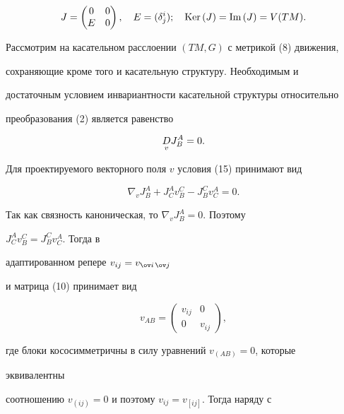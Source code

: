 $$


J=


\begin{pmatrix}


0 & 0 \\ E & 0


\end{pmatrix}


,\quad E=(\delta^i_j);\quad


\text{Ker\,}(J)=\text{Im\,}(J)=V(TM).


$$





Рассмотрим на касательном расслоении $(TM,G)$ с метрикой (8) движения,


сохраняющие кроме того и касательную структуру. Необходимым и


достаточным условием инвариантности касательной структуры относительно


преобразования (2) является равенство


\begin{equation}


\down{v}{D}J^A_B=0.


\end{equation}


Для проектируемого векторного поля $v$ условия (15) принимают вид


$$


\nabla_v J^A_B+J^A_C v^C_B-J^C_B v^A_C=0.


$$


Так как связность каноническая, то $\nabla_v J^A_B=0$. Поэтому


$J^A_C v^C_B=J^C_B v^A_C$. Тогда в


адаптированном репере $v_{ij}=v_{\ov i\,\ov j}$


и матрица (10) принимает вид


$$


v_{AB}=


\begin{pmatrix}


v_{ij} & 0 \\ 0 & v_{ij}


\end{pmatrix}


,


$$


где блоки кососимметричны в силу уравнений $v_{(AB)}=0$, которые


эквивалентны


соотношению $v_{(ij)}=0$ и поэтому $v_{ij}=v_{[ij]}$. Тогда наряду с


